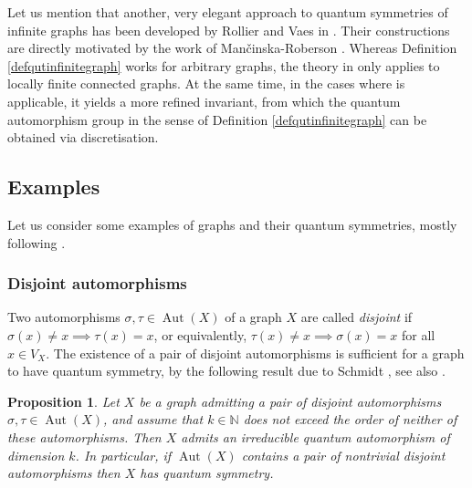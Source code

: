 \documentclass[a4paper]{amsart}
\DeclareMathOperator{\Aut}{Aut}
\numberwithin{equation}{section}
\theoremstyle{change}
\newtheorem{prop}[theorem]{Proposition}
\begin{document}
Let us mention that another, very elegant approach to quantum symmetries of infinite graphs has been developed by Rollier and Vaes in \cite{ROLLIER_VAES_quantumautomorphismgroups}. 
Their constructions are directly motivated by the work of Man\v{c}inska-Roberson \cite{MANCINSKA_ROBERSON_quantumisoplanar}. 
Whereas Definition \ref{defqutinfinitegraph} works for arbitrary graphs, the theory in \cite{ROLLIER_VAES_quantumautomorphismgroups} only applies to locally finite connected graphs.
At the same time, in the cases where \cite{ROLLIER_VAES_quantumautomorphismgroups} is applicable, it yields a more refined invariant, from which the quantum automorphism group in the sense of Definition \ref{defqutinfinitegraph} can be obtained via discretisation. 


\subsection{Examples} 

Let us consider some examples of graphs and their quantum symmetries, mostly following \cite{VOIGT_infinitequantumpermutations}. 

\subsubsection{Disjoint automorphisms} 

Two automorphisms $ \sigma, \tau \in \Aut(X) $ of a graph $ X $ are called \emph{disjoint} if $ \sigma(x) \neq x \implies \tau(x) = x $, or equivalently, $ \tau(x) \neq x \implies \sigma(x) = x $ 
for all $ x \in V_X $. The existence of a pair of disjoint automorphisms is sufficient for a graph to have quantum symmetry, by the following 
result due to Schmidt \cite[Theorem 2.2]{SCHMIDT_foldedcube}, see also \cite[Proposition 7.7]{VOIGT_infinitequantumpermutations}. 

\begin{prop} \label{disjointautomorphisms}
Let $ X $ be a graph admitting a pair of disjoint automorphisms $ \sigma, \tau \in \Aut(X) $, and assume that $ k \in \mathbb{N} $ does not exceed the order
of neither of these automorphisms. Then $ X $ admits an irreducible quantum automorphism of dimension $ k $. In particular, if $ \Aut(X) $ contains a pair of nontrivial 
disjoint automorphisms then $ X $ has quantum symmetry. 
\end{prop} 
\end{document}
